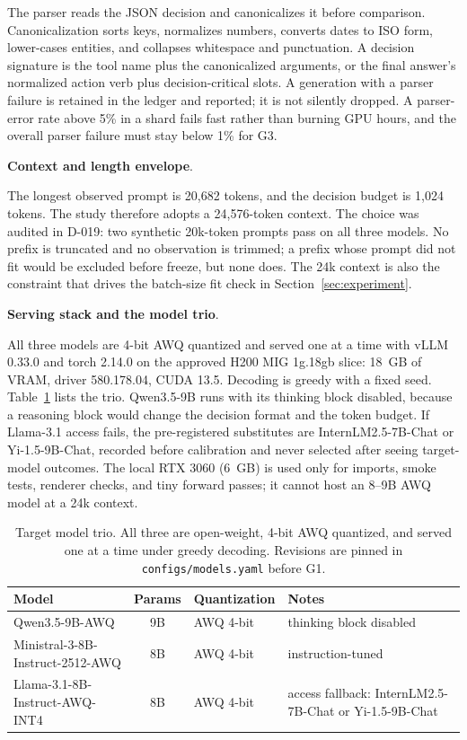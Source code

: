 \documentclass[a4paper,fleqn]{cas-sc}
\begin{document}
The parser reads the JSON decision and canonicalizes it before comparison. Canonicalization sorts
keys, normalizes numbers, converts dates to ISO form, lower-cases entities, and collapses
whitespace and punctuation. A decision signature is the tool name plus the canonicalized
arguments, or the final answer's normalized action verb plus decision-critical slots. A
generation with a parser failure is retained in the ledger and reported; it is not silently
dropped. A parser-error rate above 5\% in a shard fails fast rather than burning GPU hours, and
the overall parser failure must stay below 1\% for G3.

\noindent\textbf{Context and length envelope}.\

The longest observed prompt is 20{,}682 tokens, and the decision budget is 1{,}024 tokens. The
study therefore adopts a 24{,}576-token context. The choice was audited in D-019: two synthetic
20k-token prompts pass on all three models. No prefix is truncated and no observation is
trimmed; a prefix whose prompt did not fit would be excluded before freeze, but none does. The
24k context is also the constraint that drives the batch-size fit check in
Section~\ref{sec:experiment}.

\noindent\textbf{Serving stack and the model trio}.\

All three models are 4-bit AWQ quantized \cite{awq} and served one at a time with vLLM 0.33.0
\cite{vllm} and torch 2.14.0 on the approved H200 MIG 1g.18gb slice: 18~GB of VRAM, driver
580.178.04, CUDA 13.5.
Decoding is greedy with a fixed seed. Table~\ref{tab:models} lists the trio. Qwen3.5-9B runs with
its thinking block disabled, because a reasoning block would change the decision format and the
token budget. If Llama-3.1 access fails, the pre-registered substitutes are InternLM2.5-7B-Chat
or Yi-1.5-9B-Chat, recorded before calibration and never selected after seeing target-model
outcomes. The local RTX 3060 (6~GB) is used only for imports, smoke tests, renderer checks, and
tiny forward passes; it cannot host an 8--9B AWQ model at a 24k context.

\begin{table}[pos=htbp]
  \centering
  \caption{Target model trio. All three are open-weight, 4-bit AWQ quantized, and served one at a
  time under greedy decoding. Revisions are pinned in \texttt{configs/models.yaml} before G1.}
  \label{tab:models}
  \small
  \begin{tabular}{>{\raggedright\arraybackslash}p{4.9cm}c>{\raggedright\arraybackslash}p{2.0cm}>{\raggedright\arraybackslash}p{5.4cm}}
    \toprule
    \textbf{Model} & \textbf{Params} & \textbf{Quantization} & \textbf{Notes} \\
    \midrule
    Qwen3.5-9B-AWQ                        & 9B & AWQ 4-bit & thinking block disabled \\
    Ministral-3-8B-Instruct-2512-AWQ      & 8B & AWQ 4-bit & instruction-tuned \\
    Llama-3.1-8B-Instruct-AWQ-INT4        & 8B & AWQ 4-bit & access fallback: InternLM2.5-7B-Chat or Yi-1.5-9B-Chat \\
    \bottomrule
  \end{tabular}
\end{table}
\end{document}
